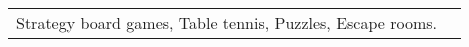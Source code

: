 \begin{tabularx}{\linewidth}{@{}l X@{}}
    Strategy board games, Table tennis, Puzzles, Escape rooms.
\end{tabularx}